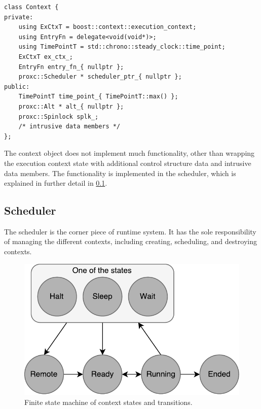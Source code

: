 \begin{lstfloat}
\begin{lstlisting}[caption={Minimal context type.}, label={lst:context_type}, style={CustomC++}, xleftmargin={4em}]
class Context {
private:
    using ExCtxT = boost::context::execution_context;
    using EntryFn = delegate<void(void*)>;
    using TimePointT = std::chrono::steady_clock::time_point;
    ExCtxT ex_ctx_;
    EntryFn entry_fn_{ nullptr };
    proxc::Scheduler * scheduler_ptr_{ nullptr };
public:
    TimePointT time_point_{ TimePointT::max() };
    proxc::Alt * alt_{ nullptr };
    proxc::Spinlock splk_;
    /* intrusive data members */
};
\end{lstlisting}
\end{lstfloat}

The context object does not implement much functionality, other than wrapping the execution context state with additional control structure data and intrusive data members. The functionality is implemented in the scheduler, which is explained in further detail in \cref{subsec:scheduler_implementation}.


\subsection{Scheduler}
\label{subsec:scheduler_implementation}

The scheduler is the corner piece of runtime system. It has the sole responsibility of managing the different contexts, including creating, scheduling, and destroying contexts.

\begin{figure}[h!]
    \centering
    \includegraphics[width=0.7\linewidth]{fig/context_states}
    \caption{Finite state machine of context states and transitions.}
    \label{fig:context_states}
\end{figure}





